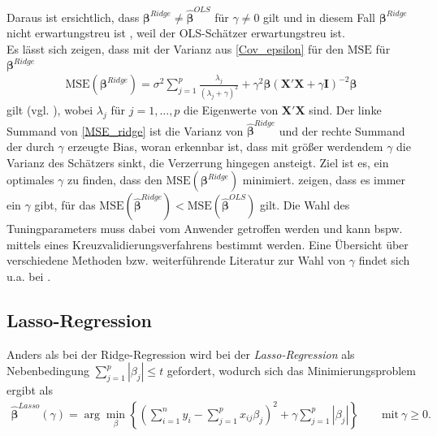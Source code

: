\documentclass[12pt, a4paper]{report}\usepackage[]{graphicx}\usepackage[]{color}
\begin{document}
Daraus ist ersichtlich, dass $\boldsymbol{\beta}^{Ridge} \ne \boldsymbol{\hat{\beta}}^{OLS}$ für $\gamma \ne 0$ gilt und in diesem Fall $\boldsymbol{\beta}^{Ridge}$ nicht erwartungstreu ist \cite{seber2003linear}, weil der OLS-Schätzer erwartungstreu ist.\\ 
Es lässt sich zeigen, dass mit der Varianz aus \eqref{Cov_epsilon} für den $\text{MSE}$ für $\boldsymbol{\beta}^{Ridge}$ 
\begin{align}\label{MSE_ridge}
\text{MSE}(\boldsymbol{\beta}^{Ridge})=\sigma^2 \sum_{j=1}^{p} \frac{\lambda_j}{(\lambda_j + \gamma)^2} + \gamma^2 \boldsymbol{\beta} (\mathbf{X}'\mathbf{X}+ \gamma \mathbf{I})^{-2}\boldsymbol{\beta}
\end{align}
gilt (vgl. ), wobei $\lambda_j$ für $j=1,\dots,p$ die Eigenwerte von $\mathbf{X}'\mathbf{X}$ sind. Der linke Summand von \eqref{MSE_ridge} ist die Varianz von $\boldsymbol{\hat{\beta}}^{Ridge}$ und der rechte Summand der durch $\gamma$ erzeugte Bias, woran erkennbar ist, dass mit größer werdendem $\gamma$ die Varianz des Schätzers sinkt, die Verzerrung hingegen ansteigt. Ziel ist es, ein optimales $\gamma$ zu finden, dass den $\text{MSE}(\boldsymbol{\beta}^{Ridge})$ minimiert.  zeigen, dass es immer ein $\gamma$ gibt, für das $\text{MSE}(\boldsymbol{\hat{\beta}}^{Ridge}) < \text{MSE}(\boldsymbol{\hat{\beta}}^{OLS})$ gilt. Die Wahl des Tuningparameters muss dabei vom Anwender getroffen werden und kann bspw. mittels eines Kreuzvalidierungsverfahrens bestimmt werden. Eine Übersicht über verschiedene Methoden bzw. weiterführende Literatur zur Wahl von $\gamma$ findet sich u.a. bei .\\

\subsection{Lasso-Regression}\label{Kap_Lasso-Regression}
Anders als bei der Ridge-Regression wird bei der \textit{Lasso-Regression} als Nebenbedingung $\sum_{j=1}^{p}|\beta_j| \le t$ gefordert, wodurch sich das Minimierungsproblem ergibt \cite{tibshirani96regression} als
\begin{align}
\boldsymbol{\hat{\beta}}^{Lasso}(\gamma)=\arg \displaystyle\min_{\beta} \left\lbrace \left(\sum_{i=1}^{n} y_i - \sum_{j=1}^{p} x_{ij} \beta_j \right)^2  + \gamma \sum_{j=1}^{p}|\beta_j| \right\rbrace \qquad \text{mit} \ \gamma \ge 0.
\end{align}
\end{document}

